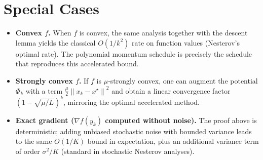 \documentclass{article}
\newcommand{\norm}[1]{\left\|#1\right\|}
\begin{document}
\section*{Special Cases}
\begin{itemize}[leftmargin=*]
\item \textbf{Convex $f$.} When $f$ is convex, the same analysis together with the descent lemma yields the classical $O(1/k^{2})$ rate on function values (Nesterov’s optimal rate). The polynomial momentum schedule is precisely the schedule that reproduces this accelerated bound.
\item \textbf{Strongly convex $f$.} If $f$ is $\mu$‑strongly convex, one can augment the potential $\Phi_{k}$ with a term $\frac{\mu}{2}\norm{x_{k}-x^{\star}}^{2}$ and obtain a linear convergence factor $(1-\sqrt{\mu/L})^{k}$, mirroring the optimal accelerated method.
\item \textbf{Exact gradient ($\nabla f(y_{k})$ computed without noise).} The proof above is deterministic; adding unbiased stochastic noise with bounded variance leads to the same $O(1/K)$ bound in expectation, plus an additional variance term of order $\sigma^{2}/K$ (standard in stochastic Nesterov analyses).
\end{itemize}
\end{document}
